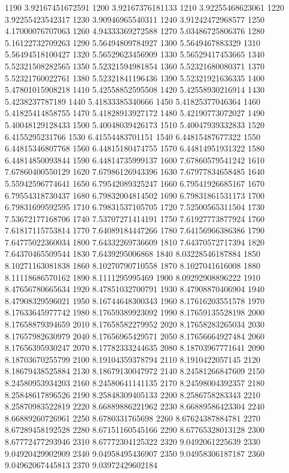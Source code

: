 {1190 3.92167451672591
1200 3.92167376181133
1210 3.92255468623061
1220 3.92255423542317
1230 3.90946965540311
1240 3.91242472968577
1250 4.17000076707063
1260 4.94333369272588
1270 5.03486725806376
1280 5.16122732709263
1290 5.56494809784927
1300 5.5649467883329
1310 5.56494518100427
1320 5.56529623456909
1330 5.56529417453665
1340 5.52321508282565
1350 5.52321594981854
1360 5.52321680080371
1370 5.52321760022761
1380 5.52321841196436
1390 5.52321921636335
1400 5.47801015908218
1410 5.42558852595508
1420 5.42558930216914
1430 5.4238237787189
1440 5.41833385340666
1450 5.41825377046364
1460 5.41825414858755
1470 5.41828913927172
1480 5.42190773072027
1490 5.40048129128433
1500 5.40048039426173
1510 5.40047939332833
1520 6.4155295231766
1530 6.41554483701151
1540 6.44815487677322
1550 6.44815346807768
1560 6.44815180474755
1570 6.44814951931322
1580 6.44814850093844
1590 6.44814735999137
1600 7.67860579541242
1610 7.67860400550129
1620 7.67986126943396
1630 7.67977834658485
1640 5.55942596774641
1650 6.79542089325247
1660 6.79541926685167
1670 6.79554318730437
1680 6.79832004814502
1690 6.79831861531173
1700 6.79831699592595
1710 6.79831537105705
1720 7.52500565311504
1730 7.53672177168706
1740 7.53707271414191
1750 7.61927773877924
1760 7.61817115753814
1770 7.64089184447266
1780 7.64156966386386
1790 7.64775022360034
1800 7.64332269736609
1810 7.64370572717394
1820 7.64370465509544
1830 7.6439295006868
1840 8.03228546187884
1850 8.10271163081838
1860 8.10270790710558
1870 8.1027041616008
1880 8.11118686570162
1890 8.1111295995469
1900 8.09292908896222
1910 8.47656780665634
1920 8.47851032700791
1930 8.47908870406904
1940 8.47908329596021
1950 8.16744648300343
1960 8.17616203551578
1970 8.17633645977742
1980 8.17659389923092
1990 8.17659135528198
2000 8.17658879394659
2010 8.17658582279952
2020 8.17658283265034
2030 8.17657982630979
2040 8.17656965429571
2050 8.17656664927484
2060 8.17656395930247
2070 8.17782333244635
2080 8.18703967771641
2090 8.18703670255799
2100 8.19104359378794
2110 8.1910422057145
2120 8.18679438525884
2130 8.18679130047972
2140 8.24581266847609
2150 8.24580953934203
2160 8.24580641141135
2170 8.24598004392357
2180 8.25848617896526
2190 8.25848309405133
2200 8.2586758283343
2210 8.25870983522819
2220 8.66889886221962
2230 8.66889586423304
2240 8.66889260726961
2250 8.6780331765698
2260 8.67624387884781
2270 8.67289458192528
2280 8.67151160545166
2290 8.67765328013128
2300 8.67772477293946
2310 8.67772304125322
2320 9.0492061225639
2330 9.04920429902909
2340 9.04958495436907
2350 9.04958306187187
2360 9.04962067445813
2370 9.03972429602184
}
